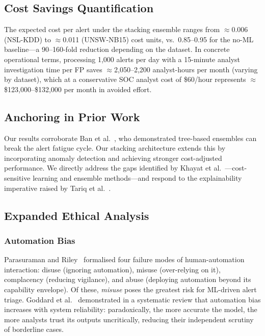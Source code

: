 \documentclass[conference]{IEEEtran}
\begin{document}
\subsection{Cost Savings Quantification}
The expected cost per alert under the stacking ensemble ranges from $\approx$0.006
(NSL-KDD) to $\approx$0.011 (UNSW-NB15) cost units, vs.\ 0.85--0.95 for the no-ML
baseline---a 90--160-fold reduction depending on the dataset.
In concrete operational terms, processing 1{,}000 alerts per day with a 15-minute analyst
investigation time per FP saves $\approx$2{,}050--2{,}200 analyst-hours per month
(varying by dataset), which at a conservative SOC analyst cost of \$60/hour represents
$\approx$\$123{,}000--\$132{,}000 per month in avoided effort.

\subsection{Anchoring in Prior Work}
Our results corroborate Ban et al.~\cite{ban2023}, who demonstrated tree-based ensembles
can break the alert fatigue cycle.
Our stacking architecture extends this by incorporating anomaly detection and achieving
stronger cost-adjusted performance.
We directly address the gaps identified by Khayat et al.~\cite{khayat2025}---cost-sensitive
learning and ensemble methods---and respond to the explainability imperative raised by
Tariq et al.~\cite{tariq2025}.

\subsection{Expanded Ethical Analysis}
\label{sec:ethics}

\subsubsection{Automation Bias}
Parasuraman and Riley~\cite{parasuraman1997} formalised four failure modes of human-automation
interaction: disuse (ignoring automation), misuse (over-relying on it), complacency (reducing
vigilance), and abuse (deploying automation beyond its capability envelope).
Of these, \emph{misuse} poses the greatest risk for ML-driven alert triage.
Goddard et al.~\cite{goddard2012} demonstrated in a systematic review that automation bias
increases with system reliability: paradoxically, the more accurate the model, the more
analysts trust its outputs uncritically, reducing their independent scrutiny of borderline cases.
\end{document}
